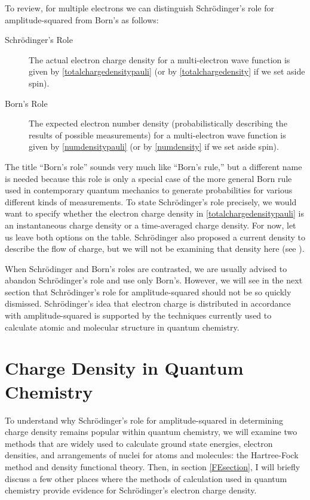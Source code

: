\documentclass[onecolumn,secnumarabic,amsmath,amssymb,balancelastpage,nofootinbib]{article}
\begin{document}
To review, for multiple electrons we can distinguish Schr\"{o}dinger's role for amplitude-squared from Born's as follows:
\begin{description}
\item [Schr\"{o}dinger's Role]  The actual electron charge density for a multi-electron wave function is given by \eqref{totalchargedensitypauli} (or by \eqref{totalchargedensity} if we set aside spin).
\item [Born's Role]  The expected electron number density (probabilistically describing the results of possible measurements) for a multi-electron wave function is given by \eqref{numdensitypauli} (or by \eqref{numdensity} if we set aside spin).
\end{description}
The title ``Born's role'' sounds very much like ``Born's rule,'' but a different name is needed because this role is only a special case of the more general Born rule used in contemporary quantum mechanics to generate probabilities for various different kinds of measurements.  To state Schr\"{o}dinger's role precisely, we would want to specify whether the electron charge density in \eqref{totalchargedensitypauli} is an instantaneous charge density or a time-averaged charge density.  For now, let us leave both options on the table.  Schr\"{o}dinger \cite{schrodinger1926pt4} also proposed a current density to describe the flow of charge, but we will not be examining that density here (see \cite{bader2010}).

When Schr\"{o}dinger and Born's roles are contrasted, we are usually advised to abandon Schr\"{o}dinger's role and use only Born's.  However, we will see in the next section that Schr\"{o}dinger's role for amplitude-squared should not be so quickly dismissed.  Schr\"{o}dinger's idea that electron charge is distributed in accordance with amplitude-squared is supported by the techniques currently used to calculate atomic and molecular structure in quantum chemistry.









\section{Charge Density in Quantum Chemistry}\label{QCsection}

To understand why Schr\"{o}dinger's role for amplitude-squared in determining charge density remains popular within quantum chemistry, we will examine two methods that are widely used to calculate ground state energies, electron densities, and arrangements of nuclei for atoms and molecules: the Hartree-Fock method and density functional theory.  Then, in section \ref{FEsection}, I will briefly discuss a few other places where the methods of calculation used in quantum chemistry provide evidence for Schr\"{o}dinger's electron charge density.
\end{document}
